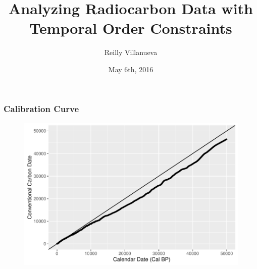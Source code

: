 \documentclass{beamer} %
\title[Radiocarbon Dating with MCMC]{Analyzing Radiocarbon Data with Temporal Order Constraints}
\institute[]{Department of Mathematics}
\author[]{Reilly Villanueva}
\date{May 6th, 2016}
\begin{document}
\begin{frame}
	\titlepage

\end{frame}

%
%
%
%    
%


\begin{frame}
	\frametitle{Calibration Curve}
	\begin{figure}
	\includegraphics[width=\textwidth]{fullcal}
	\end{figure}

\end{frame}

\end{document}
